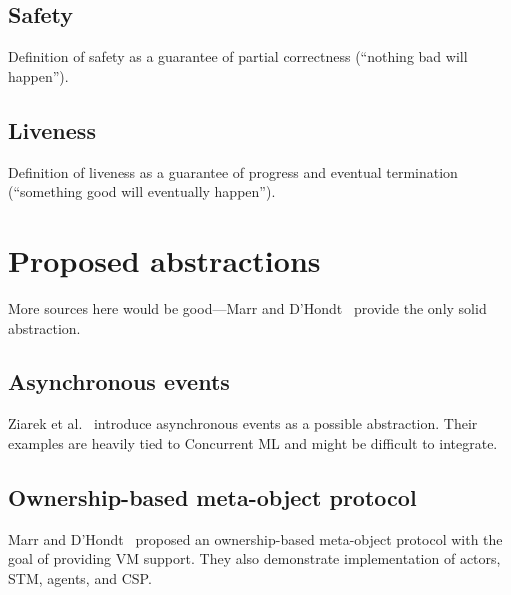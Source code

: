 \documentclass{sig-alternate}
\begin{document}
\subsection{Safety}

Definition of safety as a guarantee of partial correctness (``nothing bad will happen'').

\subsection{Liveness}

Definition of liveness as a guarantee of progress and eventual termination (``something good will eventually happen'').

\section{Proposed abstractions}

More sources here would be good---Marr and D'Hondt~\cite{Marr2012} provide the only solid abstraction.

\subsection{Asynchronous events}

Ziarek et al.~\cite{Ziarek2011} introduce asynchronous events as a possible abstraction. Their examples are heavily tied to Concurrent ML and might be difficult to integrate.

\subsection{Ownership-based meta-object protocol}

Marr and D'Hondt~\cite{Marr2012} proposed an ownership-based meta-object protocol with the goal of providing VM support. They also demonstrate implementation of actors, STM, agents, and CSP.

\printbibliography{}
\end{document}
